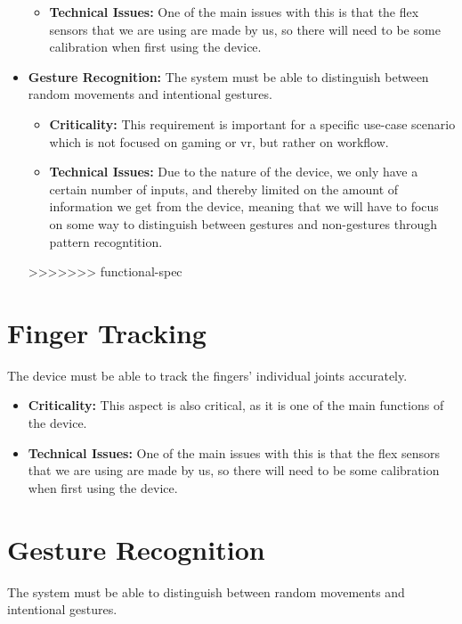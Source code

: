 \documentclass[12pt,a4paper,oneside]{book}
\theoremstyle{plain}
\numberwithin{equation}{chapter}
\newcounter{Secnum}
\begin{document}
\begin{itemize}
\begin{itemize}
            \item \textbf{Technical Issues:} One of the main issues with this is that the flex sensors that we are using are made by us, so there will need to be some calibration when first using the device.
        \end{itemize}
    \item \textbf{Gesture Recognition:} The system must be able to distinguish between random movements and intentional gestures.
        \begin{itemize}
            \item \textbf{Criticality:} This requirement is important for a specific use-case scenario which is not focused on gaming or vr, but rather on workflow.
            \item \textbf{Technical Issues:} Due to the nature of the device, we only have a certain number of inputs, and thereby limited on the amount of information we get from the device, meaning that we will have to focus on some way to distinguish between gestures and non-gestures through pattern recogntition.
        \end{itemize}
>>>>>>> functional-spec
\end{itemize}


\section{\textbf{Finger Tracking}}

\noindent The device must be able to track the fingers' individual joints accurately.

\begin{itemize}
    \item \textbf{Criticality:} This aspect is also critical, as it is one of the main functions of the device.
    \item \textbf{Technical Issues:} One of the main issues with this is that the flex sensors that we are using are made by us, so there will need to be some calibration when first using the device.
\end{itemize}

\section{\textbf{Gesture Recognition}}

\noindent The system must be able to distinguish between random movements and intentional gestures.
\end{document}
